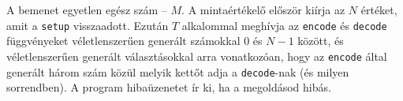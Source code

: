 \documentclass[12pt]{article}
\begin{document}
A bemenet egyetlen egész szám -- $M$. A mintaértékelő először kiírja az $N$ értéket, amit a \texttt{setup} visszaadott. Ezután $T$ alkalommal meghívja az \texttt{encode} és \texttt{decode} függvényeket véletlenszerűen generált számokkal $0$ és $N-1$ között, és véletlenszerűen generált választásokkal arra vonatkozóan, hogy az \texttt{encode} által generált három szám közül melyik kettőt adja a \texttt{decode}-nak (és milyen sorrendben). A program hibaüzenetet ír ki, ha a megoldásod hibás.
\end{document}
